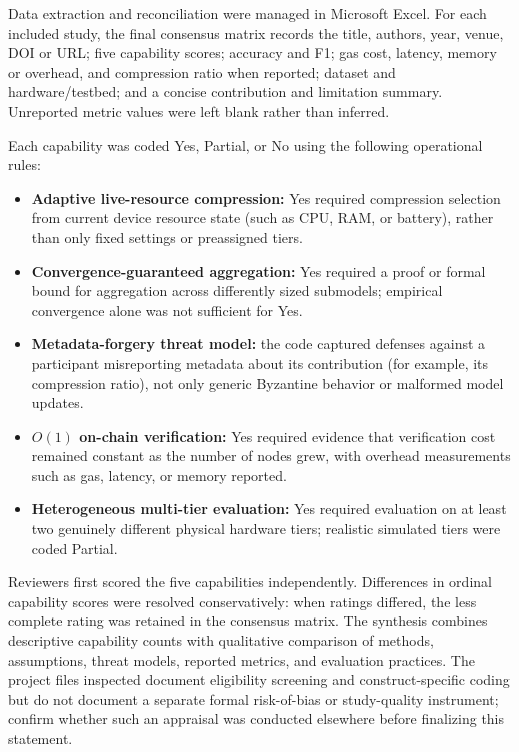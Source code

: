 \documentclass[journal]{IEEEtran}
\begin{document}
Data extraction and reconciliation were managed in Microsoft Excel. For each included study, the final consensus matrix records the title, authors, year, venue, DOI or URL; five capability scores; accuracy and F1; gas cost, latency, memory or overhead, and compression ratio when reported; dataset and hardware/testbed; and a concise contribution and limitation summary. Unreported metric values were left blank rather than inferred.

Each capability was coded Yes, Partial, or No using the following operational rules:
\begin{itemize}
  \item \textbf{Adaptive live-resource compression:} Yes required compression selection from current device resource state (such as CPU, RAM, or battery), rather than only fixed settings or preassigned tiers.
  \item \textbf{Convergence-guaranteed aggregation:} Yes required a proof or formal bound for aggregation across differently sized submodels; empirical convergence alone was not sufficient for Yes.
  \item \textbf{Metadata-forgery threat model:} the code captured defenses against a participant misreporting metadata about its contribution (for example, its compression ratio), not only generic Byzantine behavior or malformed model updates.
  \item \textbf{$O(1)$ on-chain verification:} Yes required evidence that verification cost remained constant as the number of nodes grew, with overhead measurements such as gas, latency, or memory reported.
  \item \textbf{Heterogeneous multi-tier evaluation:} Yes required evaluation on at least two genuinely different physical hardware tiers; realistic simulated tiers were coded Partial.
\end{itemize}

Reviewers first scored the five capabilities independently. Differences in ordinal capability scores were resolved conservatively: when ratings differed, the less complete rating was retained in the consensus matrix. The synthesis combines descriptive capability counts with qualitative comparison of methods, assumptions, threat models, reported metrics, and evaluation practices. The project files inspected document eligibility screening and construct-specific coding but do not document a separate formal risk-of-bias or study-quality instrument; confirm whether such an appraisal was conducted elsewhere before finalizing this statement.
\end{document}
